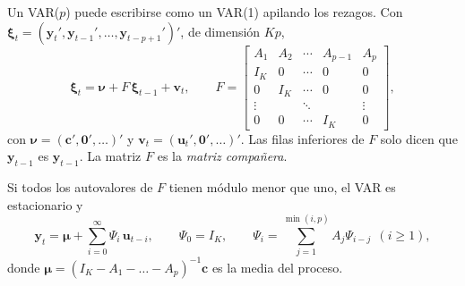 Un VAR($p$) puede escribirse como un VAR(1) apilando los rezagos. Con
$\boldsymbol\xi_t=(\mathbf y_t',\mathbf y_{t-1}',\dots,\mathbf y_{t-p+1}')'$, de dimensión $Kp$,
\[
  \boldsymbol\xi_t=\boldsymbol\nu+F\,\boldsymbol\xi_{t-1}+\mathbf v_t,\qquad
  F=\begin{bmatrix}
      A_1 & A_2 & \cdots & A_{p-1} & A_p\\
      I_K & 0   & \cdots & 0       & 0\\
      0   & I_K & \cdots & 0       & 0\\
      \vdots &  & \ddots &         & \vdots\\
      0   & 0   & \cdots & I_K     & 0
    \end{bmatrix},
\]
con $\boldsymbol\nu=(\mathbf c',\mathbf 0',\dots)'$ y $\mathbf v_t=(\mathbf u_t',\mathbf 0',\dots)'$. Las filas
inferiores de $F$ solo dicen que $\mathbf y_{t-1}$ es $\mathbf y_{t-1}$. La matriz $F$ es la \emph{matriz
compañera}.

\begin{proposicion}\label{prop:varma}
Si todos los autovalores de $F$ tienen módulo menor que uno, el VAR es estacionario y
\[
  \mathbf y_t=\boldsymbol\mu+\sum_{i=0}^{\infty}\Psi_i\,\mathbf u_{t-i},\qquad \Psi_0=I_K,\qquad
  \Psi_i=\sum_{j=1}^{\min(i,p)}A_j\Psi_{i-j}\ \ (i\ge1),
\]
donde $\boldsymbol\mu=(I_K-A_1-\dots-A_p)^{-1}\mathbf c$ es la media del proceso.
\end{proposicion}

